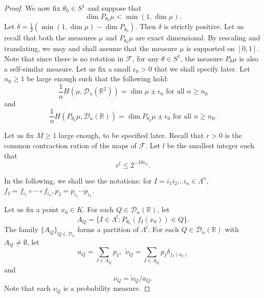 \documentclass[a4paper,11pt]{amsart}
\theoremstyle{definition}
\numberwithin{equation}{section}
\def\D{\mathcal{D}}
\def\R{\mathbb R}
\begin{document}
\begin{proof}
We now fix $\theta_0\in S^1$ and suppose that 
\[
\dim P_{\theta_0}\mu<\min(1,\dim \mu).
\]
Let $\delta=\frac{1}{2}(\min(1,\dim \mu)-\dim P_{\theta_0})$. Then $\delta$ is strictly positive.  Let us recall that both the measures $\mu$ and $P_{\theta_0}\mu$ are exact dimensional.  
By rescaling and translating, we may and shall assume that the measure $\mu$ is supported on $[0,1]$. 
Note that since there is no rotation in $\mathcal{F}$, for any $\theta\in S^1$, the measure $P_\theta\mu$ is also a self-similar measure. 
Let us fix a small $\epsilon_0>0$ that we shall specify later. 
Let $n_0\ge1$ be large enough such that the following hold:
\begin{equation}\label{eq:proof:thm-proj-self-similar-1:2}
\frac{1}{n}H(\mu,\D_n(\R^2))=\dim\mu\pm \epsilon_0  \textrm{ for all } n\ge n_0
\end{equation}
and 
\begin{equation}\label{eq:proof:thm-proj-self-similar-1:3}
\frac{1}{n}H(P_{\theta_0}\mu,\D_n(\R))=\dim P_{\theta_0}\mu\pm \epsilon_0  \textrm{ for all } n\ge n_0.
\end{equation}

{\color{blue}Let us fix $M\ge 1$ large enough, to be specified later.  Recall that $r>0$ is the common contraction ration of the maps of $\mathcal{F}$. 
Let $l$ be the smallest integer such that 
\[
r^l\le 2^{-Mn_0}.
\]
}

In the following, we shall use the notations: for $I=i_1i_2\ldots i_n\in \Lambda^n$, $f_I=f_{i_1}\circ \cdots \circ f_{i_n},  p_I=p_{i_1} \cdots p_{i_n}$. 

Let us fix a point $x_0\in K$. For each  $Q\in \D_n(\R)$, let 
\[
A_Q=\{ I\in \Lambda^l: P_{\theta_0}(f_I(x_0))\in Q  \}. 
\]
The family $\{A_Q\}_{Q\in \D_n}$ forms a partition of $\Lambda^l$.  For each $Q\in \D_n(\R) $ with $A_Q\neq \emptyset$, let 
\[
a_Q=\sum_{I\in A_Q}p_I,  \ \  \tilde{\nu}_Q=\sum_{I\in A_Q}p_I\delta_{f_I(x_0)} \]
and
\[
 \nu_Q=\tilde{\nu}_Q/a_Q.
\]
Note that each $\nu_Q$ is a probability measure.


\end{proof}
\end{document}

